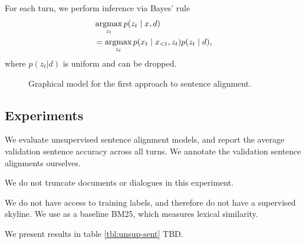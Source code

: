 \documentclass[11pt]{article}
\begin{document}
For each turn, we perform inference via Bayes' rule
\begin{equation}
\begin{aligned}
&\operatorname*{argmax}_{z_t} p(z_t \mid x, d)\\
&= \operatorname*{argmax}_{z_t} p(x_t \mid x_{<t}, z_t)p(z_t\mid d),
\end{aligned}
\end{equation}
where $p(z_t|d)$ is uniform and can be dropped.

\begin{figure}[t]
\begin{center}
\end{center}
\caption{Graphical model for the first approach to sentence alignment.
}
\label{fig:pgm-sent1}
\end{figure}

\subsection{Experiments}
We evaluate unsupervised sentence alignment models,
and report the average validation sentence accuracy across all turns.
We annotate the validation sentence alignments ourselves.

We do not truncate documents or dialogues in this experiment.

We do not have access to training labels, and therefore do not have a supervised skyline.
We use as a baseline BM25, which measures lexical similarity.

We present results in table \ref{tbl:unsup-sent} TBD.
\end{document}
